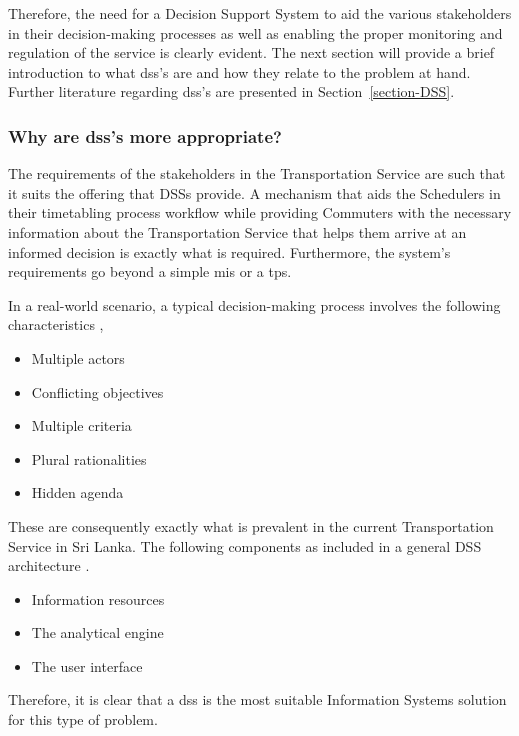 Therefore, the need for a Decision Support System to aid the various stakeholders in their decision-making processes as well as enabling the proper monitoring and regulation of the service is clearly evident. The next section will provide a brief introduction to what \acrshort{dss}'s are and how they relate to the problem at hand.  Further literature regarding \acrshort{dss}'s are presented in Section~\ref{section-DSS}.

\subsubsection {Why are \acrshort{dss}'s more appropriate?}

The requirements of the stakeholders in the Transportation Service are such that it suits the offering that DSSs provide. A mechanism that aids the Schedulers in their timetabling process workflow while providing Commuters with the necessary information about the Transportation Service that helps them arrive at an informed decision is exactly what is required. Furthermore, the system's requirements go beyond a simple \acrshort{mis} or a \acrshort{tps}.

In a real-world scenario, a typical decision-making process involves the following characteristics \cite{Fedra2000},

\begin {itemize}
\item Multiple actors
\item Conflicting objectives
\item Multiple criteria
\item Plural rationalities
\item Hidden agenda
\end {itemize}

These are consequently exactly what is prevalent in the current Transportation Service in Sri Lanka.  The following components as included in a general DSS architecture \cite{Fedra2000}.

\begin {itemize}
\item Information resources
\item The analytical engine
\item The user interface
\end {itemize}

Therefore, it is clear that a \acrshort{dss} is the most suitable Information Systems solution for this type of problem.



